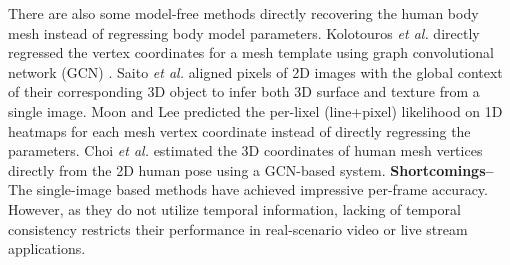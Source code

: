 \documentclass[10pt,twocolumn,letterpaper]{article}
\begin{document}
There are also some model-free methods directly recovering the human body mesh instead of regressing body model parameters. Kolotouros \textit{et al.} \cite{kolotouros2019convolutional} directly regressed the vertex coordinates for a mesh template using graph convolutional network (GCN) \cite{kipf2016semi}. Saito \textit{et al.} \cite{saito2019pifu} aligned pixels of 2D images with the global context of their corresponding 3D object to infer both 3D surface and texture from a single image. Moon and Lee \cite{moon2020i2l} predicted the per-lixel (line+pixel) likelihood on 1D heatmaps for each mesh vertex coordinate instead of directly regressing the parameters. Choi \textit{et al.} \cite{choi2020pose2mesh} estimated the 3D coordinates of human mesh vertices directly from the 2D human pose using a GCN-based system. \textbf{Shortcomings--}The single-image based methods have achieved impressive per-frame accuracy. However, as they do not utilize temporal information, lacking of temporal consistency restricts their performance in real-scenario video or live stream applications.
\end{document}
